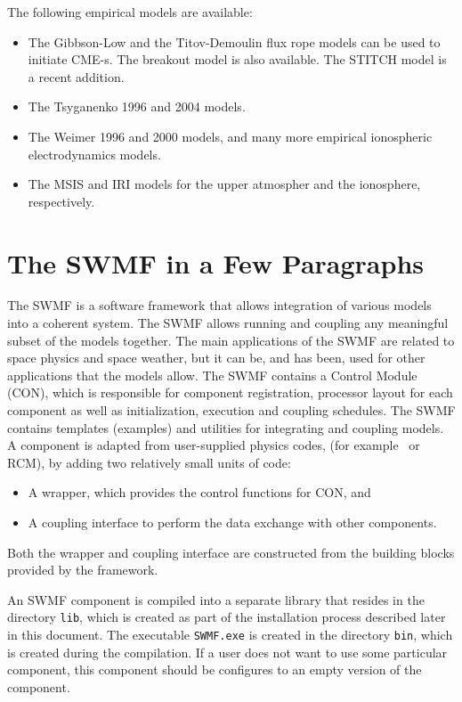 The following empirical models are available:
\begin{itemize}
\item[EEE] The Gibbson-Low and the Titov-Demoulin flux rope models
          can be used to initiate CME-s. The breakout model is
          also available. The STITCH model is a recent addition.
\item[EGM] The Tsyganenko 1996 and 2004 models.
\item[EIE] The Weimer 1996 and 2000 models, and many more empirical
          ionospheric electrodynamics models.
\item[EUA] The MSIS and IRI models for the upper atmospher and the 
          ionosphere, respectively.
\end{itemize}

\section{The SWMF in a Few Paragraphs}

The SWMF is a software framework that allows integration
of various models into a coherent system. The SWMF allows
running and coupling any meaningful subset of the models together.
The main applications of the SWMF are related to space
physics and space weather, but it can be, and has been, used for 
other applications that the models allow.
The SWMF contains a Control Module (CON), which is responsible for
component registration, processor layout for each component as well
as initialization, execution and coupling schedules.  
The SWMF contains templates (examples) and utilities for 
integrating and coupling models. 
A component is adapted from user-supplied physics codes,
(for example \BATSRUS\ or RCM), by adding two relatively small units
of code:
\begin{itemize}
\item A wrapper, which provides the control functions for CON, and
\item A coupling interface to perform the data exchange with other
components.
\end{itemize}
Both the wrapper and coupling interface are constructed from the
building blocks provided by the framework. 

An SWMF component is compiled into a separate library that resides in
the directory {\tt lib}, which is created as part of the installation
process described later in this document. The executable {\tt SWMF.exe}
is created in the
directory {\tt bin}, which is created during the compilation.  If a
user does not want to use some particular component, this component
should be configures to an empty version of the component.

